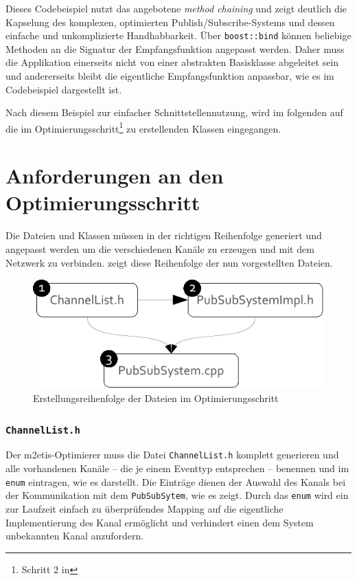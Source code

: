 

Dieses Codebeispiel nutzt das angebotene \emph{method chaining} und zeigt deutlich die Kapselung des komplexen, optimierten Publish/\-Subscribe-Systems und dessen einfache und unkomplizierte Handhabbarkeit. Über \texttt{boost::bind} können beliebige Methoden an die Signatur der Empfangsfunktion angepasst werden. Daher muss die Applikation einerseits nicht von einer abstrakten Basisklasse abgeleitet sein und andererseits bleibt die eigentliche Empfangsfunktion anpassbar, wie es im Codebeispiel dargestellt ist.

Nach diesem Beispiel zur einfacher Schnittstellennutzung, wird im folgenden auf die im Optimierungsschritt\footnote{Schritt 2 in } zu erstellenden Klassen eingegangen.

\section{Anforderungen an den Optimierungsschritt}
Die Dateien und Klassen müssen in der richtigen Reihenfolge generiert und angepasst werden um die verschiedenen Kanäle zu erzeugen und mit dem Netzwerk zu verbinden.  zeigt diese Reihenfolge der nun vorgestellten Dateien.

\begin{figure}[!h]
\centering
\includegraphics{grafics/reihenfolge.pdf}
\caption{Erstellungsreihenfolge der Dateien im Optimierungsschritt}
\label{fig:reihenfolge}
\end{figure}


\subsubsection*{\texttt{ChannelList.h}}
Der \ac{m2etis}-Optimierer muss die Datei \texttt{ChannelList.h} komplett generieren und alle vorhandenen Kanäle -- die je einem Eventtyp entsprechen -- benennen und im \texttt{enum} eintragen, wie es  darstellt. Die Einträge dienen der Auswahl des Kanals bei der Kommunikation mit dem \texttt{PubSubSytem}, wie es  zeigt. Durch das \texttt{enum} wird ein zur Laufzeit einfach zu überprüfendes Mapping auf die eigentliche Implementierung des Kanal ermöglicht und verhindert einen dem System unbekannten Kanal anzufordern.

